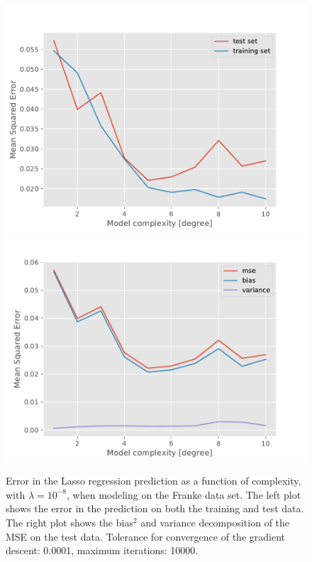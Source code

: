 \begin{figure}[!h]
    \centering
    \includegraphics[scale=0.48]{Figures/LASSO/deg_analysis_lasso_test_train_020.pdf}
    \includegraphics[scale=0.48]{Figures/LASSO/deg_analysis_lasso_bias_variance_021.pdf}
    \caption{Error in the Lasso regression prediction as a function of complexity, with $\lambda = 10^{-8}$, when modeling on the Franke data set. The left plot shows the error in the prediction on both the training and test data. The right plot shows the bias$^2$ and variance decomposition of the MSE on the test data. Tolerance for convergence of the gradient descent: 0.0001, maximum iterations: 10000.}
    \label{fig:lasso_test_train_bias_variance}
\end{figure}

